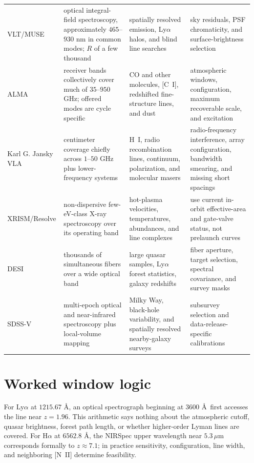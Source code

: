 \begin{longtable}{@{}p{}p{}p{}p{}@{}}
\addlinespace
VLT/MUSE &
optical integral-field spectroscopy, approximately $465$--$930$ nm in common
modes; $R$ of a few thousand &
spatially resolved emission, Ly$\alpha$ halos, and blind line searches &
sky residuals, PSF chromaticity, and surface-brightness selection\\
\addlinespace
ALMA &
receiver bands collectively cover much of $35$--$950$ GHz; offered modes are
cycle specific &
CO and other molecules, [C~I], redshifted fine-structure lines, and dust &
atmospheric windows, configuration, maximum recoverable scale, and excitation
\citep{ALMAHandbook2026}\\
\addlinespace
Karl G. Jansky VLA &
centimeter coverage chiefly across $1$--$50$ GHz plus lower-frequency systems &
H~I, radio recombination lines, continuum, polarization, and molecular masers &
radio-frequency interference, array configuration, bandwidth smearing, and
missing short spacings \citep{VLAOSS2026}\\
\addlinespace
XRISM/Resolve &
non-dispersive few-eV-class X-ray spectroscopy over its operating band &
hot-plasma velocities, temperatures, abundances, and line complexes &
use current in-orbit effective-area and gate-valve status, not prelaunch curves
\citep{XRISMPOG2026}\\
\addlinespace
DESI &
thousands of simultaneous fibers over a wide optical band &
large quasar samples, Ly$\alpha$ forest statistics, galaxy redshifts &
fiber aperture, target selection, spectral covariance, and survey masks
\citep{DESIInstrument2016,DESI2025LyA}\\
\addlinespace
SDSS-V &
multi-epoch optical and near-infrared spectroscopy plus local-volume mapping &
Milky Way, black-hole variability, and spatially resolved nearby-galaxy surveys &
subsurvey selection and data-release-specific calibrations
\citep{Kollmeier2017,SDSSVDocs2026}\\
\bottomrule
\end{longtable}

\section{Worked window logic}

For Ly$\alpha$ at $1215.67$ \AA, an optical spectrograph beginning at
$3600$ \AA\ first accesses the line near $z=1.96$. This arithmetic says
nothing about the atmospheric cutoff, quasar brightness, forest path length,
or whether higher-order Lyman lines are covered. For H$\alpha$ at
$6562.8$ \AA, the NIRSpec upper wavelength near $5.3\,\mu$m corresponds
formally to $z\approx7.1$; in practice sensitivity, configuration, line width,
and neighboring [N~II] determine feasibility.

